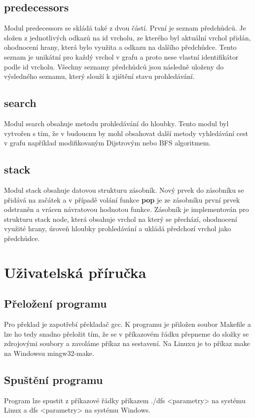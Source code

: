 \documentclass[
12pt,
a4paper,
pdftex,
czech,
titlepage
]{report}
\begin{document}
\section{predecessors}
Modul predecessors se skládá také z dvou částí. První je seznam předchůdců. Je složen z jednotlivých odkazů na id vrcholu, ze kterého byl aktuální vrchol přidán, ohodnocení hrany, která bylo využita a odkazu na dalšího předchůdce. Tento seznam je unikátní pro každý vrchol v grafu a proto nese vlastní identifikátor podle id vrcholu. Všechny seznamy předchůdců jsou následně uloženy do výsledného seznamu, který slouží k zjištění stavu prohledávání.

\section{search}
Modul search obsahuje metodu prohledávání do hloubky. Tento modul byl vytvořen s tím, že v budoucnu by mohl obsahovat další metody vyhledávání cest v grafu například modifikovaným Dijstrovým nebo BFS algoritmem.

\section{stack}
Modul stack obsahuje datovou strukturu zásobník. Nový prvek do zásobníku se přidává na začátek a v případě volání funkce \textbf{pop} je ze zásobníku první prvek odstraněn a vrácen návratovou hodnotou funkce. Zásobník je implementován pro strukturu stack node, která obsahuje vrchol na který se přechází, ohodnocení využité hrany, úroveň hloubky prohledávání a ukládá předchozí vrchol jako předchůdce.

\chapter{Uživatelská příručka}
\section{Přeložení programu}
Pro překlad je zapotřebí překladač gcc. K programu je přiložen soubor Makefile a lze ho tedy snadno přeložit tím, že se v příkazovém řádku přepneme do složky se zdrojovými soubory a zavoláme příkaz na sestavení. Na Linuxu je to příkaz make na Windowsu mingw32-make.

\section{Spuštění programu}
Program lze spustit z příkazové řádky příkazem ./dfs <parametry> na systému Linux a dfs <parametry> na systému Windows.\\
\end{document}
